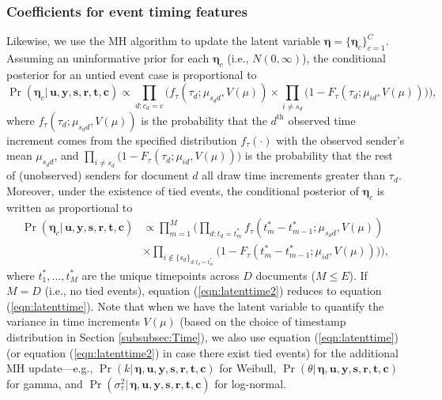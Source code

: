 \documentclass[ba]{imsart}
\numberwithin{equation}{section}
\theoremstyle{plain}
\begin{document}
	\subsubsection{Coefficients for event timing features}
	Likewise, we use the MH algorithm to update the latent variable $\boldsymbol{\eta}=\{\boldsymbol{\eta}_c\}_{c=1}^C$. Assuming an uninformative prior for each $\boldsymbol{\eta}_c$ (i.e., $N({0},\infty)$), the conditional posterior for an untied event case is proportional to~
	\begin{equation}
		\Pr(\boldsymbol{\eta}_c|\, \boldsymbol{u}, \boldsymbol{y},\boldsymbol{s}, \boldsymbol{r},\boldsymbol{t},\boldsymbol{c})\propto \prod_{d:c_d=c}\Big(f_{\tau}(\tau_{d}; \mu_{s_d d}, V(\mu))\times \prod_{i\neq s_d}\big(1-F_{\tau}(\tau_{d}; \mu_{id}, V(\mu)) \big)\Big),
		\label{eqn:latenttime}
	\end{equation}
	where $f_{\tau}(\tau_{d}; \mu_{s_d d}, V(\mu))$ is the probability that the $d^{\textrm{th}}$ observed time increment comes from the specified distribution $f_\tau(\cdot)$ with the observed sender's mean $\mu_{s_d d}$, and $\prod_{i\neq s_d}\big(1-F_{\tau}(\tau_{d}; \mu_{id},V(\mu)) \big)$ is the probability that the rest of (unobserved) senders for document $d$ all draw time increments greater than $\tau_d$. Moreover, under the existence of tied events, the conditional posterior of $\boldsymbol{\eta}_c$ is written as proportional to
	\begin{equation}
		\begin{aligned}
			\Pr(\boldsymbol{\eta}_c|\, \boldsymbol{u}, \boldsymbol{y},\boldsymbol{s}, \boldsymbol{r},\boldsymbol{t},\boldsymbol{c})&\propto \prod_{m=1}^M\Big(\prod_{d:t_d=t_m^*}f_{\tau}(t_m^*-t_{m-1}^*; \mu_{s_d d}, V(\mu)) \\&\times \prod_{i \notin \{s_d\}_{d:t_d=t_m^*}}\big(1-F_{\tau}(t_m^*-t_{m-1}^*; \mu_{id}, V(\mu)) \big)\Big),
		\end{aligned}
		\label{eqn:latenttime2}
	\end{equation}
	where $t_1^*,\ldots,t_M^*$ are the unique timepoints across $D$ documents ($M \leq E$). If $M=D$ (i.e., no tied events), equation (\ref{eqn:latenttime2}) reduces to equation (\ref{eqn:latenttime}). Note that when we have the latent variable to quantify the variance in time increments $V(\mu)$ (based on the choice of timestamp distribution in Section \ref{subsubsec:Time}), we also use equation (\ref{eqn:latenttime}) (or equation (\ref{eqn:latenttime2}) in case there exist tied events) for the additional MH update---e.g., $\Pr(k|\, \boldsymbol{\eta},\boldsymbol{u}, \boldsymbol{y},\boldsymbol{s}, \boldsymbol{r},\boldsymbol{t},\boldsymbol{c})$ for Weibull, $\Pr(\theta|\, \boldsymbol{\eta},\boldsymbol{u}, \boldsymbol{y},\boldsymbol{s}, \boldsymbol{r},\boldsymbol{t},\boldsymbol{c})$ for gamma, and  $\Pr(\sigma^2_\tau| \,\boldsymbol{\eta},\boldsymbol{u}, \boldsymbol{y},\boldsymbol{s}, \boldsymbol{r},\boldsymbol{t},\boldsymbol{c})$ for log-normal.
\end{document}
